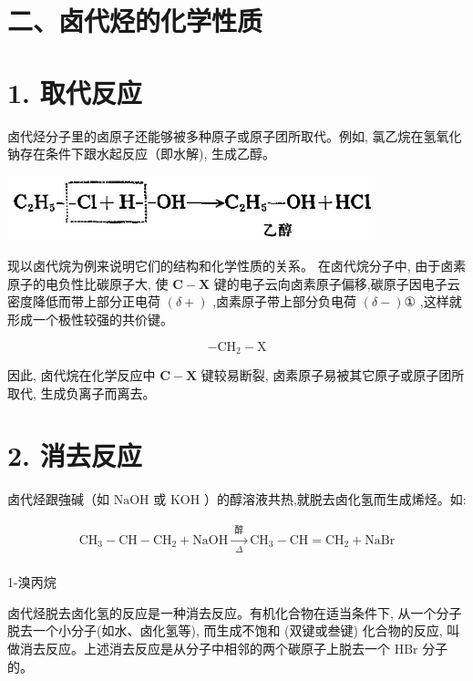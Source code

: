 \documentclass[10pt]{article}
\begin{document}
\section*{二、卤代烃的化学性质}

\section*{1. 取代反应}

卤代烃分子里的卤原子还能够被多种原子或原子团所取代。例如, 氯乙烷在氢氧化钠存在条件下跟水起反应（即水解), 生成乙醇。

\begin{center}
\includegraphics[max width=0.8\textwidth]{images/01912d16-be99-77bb-9535-4f3ed8d9946f_111_846431.jpg}
\end{center}

现以卤代烷为例来说明它们的结构和化学性质的关系。 在卤代烷分子中, 由于卤素原子的电负性比碳原子大, 使 \(\mathbf{C} - \mathbf{X}\) 键的电子云向卤素原子偏移,碳原子因电子云密度降低而带上部分正电荷 \(\left( {\delta + }\right)\) ,卤素原子带上部分负电荷 \(\left( {\delta - }\right) \text{①}\) ,这样就形成一个极性较强的共价键。

\[
- {\mathrm{{CH}}}_{2} - \mathrm{X}
\]

因此, 卤代烷在化学反应中 \(\mathbf{C} - \mathbf{X}\) 键较易断裂, 卤素原子易被其它原子或原子团所取代, 生成负离子而离去。

\section*{2. 消去反应}

卤代烃跟強碱（如 \(\mathrm{{NaOH}}\) 或 \(\mathrm{{KOH}}\) ）的醇溶液共热,就脱去卤化氢而生成烯烃。如:

\[
\begin{array}{l} {\mathrm{{CH}}}_{3} - \mathrm{{CH}} - {\mathrm{{CH}}}_{2} + \mathrm{{NaOH}}\xrightarrow[\Delta ]{\text{ 醇 }}{\mathrm{{CH}}}_{3} - \mathrm{{CH}} = {\mathrm{{CH}}}_{2} + \mathrm{{NaBr}} \\ \end{array}
\]

1-溴丙烷

卤代烃脱去卤化氢的反应是一种消去反应。有机化合物在适当条件下, 从一个分子脱去一个小分子(如水、卤化氢等), 而生成不饱和 (双键或叁键) 化合物的反应, 叫做消去反应。上述消去反应是从分子中相邻的两个碳原子上脱去一个 \(\mathrm{{HBr}}\) 分子的。
\end{document}
